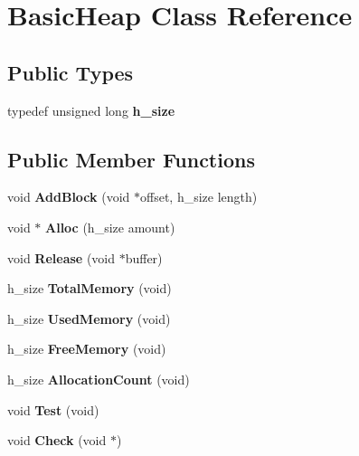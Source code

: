\hypertarget{class_basic_heap}{}\section{Basic\+Heap Class Reference}
\label{class_basic_heap}
\subsection*{Public Types}
\begin{DoxyCompactItemize}
\item 
\mbox{\label{class_basic_heap_ab373b139903271cba9a74038376746dc}} 
typedef unsigned long {\bfseries h\+\_\+size}
\end{DoxyCompactItemize}
\subsection*{Public Member Functions}
\begin{DoxyCompactItemize}
\item 
\mbox{\label{class_basic_heap_a09729479676d8ccfb2fb59cb140a6aa9}} 
void {\bfseries Add\+Block} (void $\ast$offset, h\+\_\+size length)
\item 
\mbox{\label{class_basic_heap_a6227b3a159cf1769e8c758ee7abe1991}} 
void $\ast$ {\bfseries Alloc} (h\+\_\+size amount)
\item 
\mbox{\label{class_basic_heap_a0ccbe7addeaf3f48971b810b595ac384}} 
void {\bfseries Release} (void $\ast$buffer)
\item 
\mbox{\label{class_basic_heap_a85cda28f3010ea9224126f3e067f7c3e}} 
h\+\_\+size {\bfseries Total\+Memory} (void)
\item 
\mbox{\label{class_basic_heap_a3fbb4aa5e17a3cdbeaff444b7022fd23}} 
h\+\_\+size {\bfseries Used\+Memory} (void)
\item 
\mbox{\label{class_basic_heap_a3cb545adb35965285f84f2081a8da796}} 
h\+\_\+size {\bfseries Free\+Memory} (void)
\item 
\mbox{\label{class_basic_heap_aa4889e648609784e5dca60da308d50dd}} 
h\+\_\+size {\bfseries Allocation\+Count} (void)
\item 
\mbox{\label{class_basic_heap_abbef5717b4fd5d3f366bf89725671abe}} 
void {\bfseries Test} (void)
\item 
\mbox{\label{class_basic_heap_a1073a696e46034763b0c79306ba8b03d}} 
void {\bfseries Check} (void $\ast$)
\end{DoxyCompactItemize}
